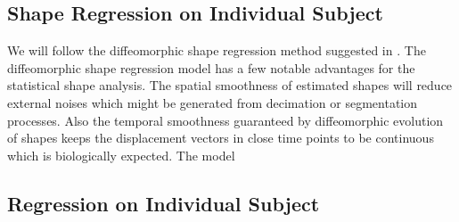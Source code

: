 \documentclass[10pt]{article}
\begin{document}
\subsection*{Shape Regression on Individual Subject}

We will follow the diffeomorphic shape regression method suggested in \cite{Fishbaugh2013}. The diffeomorphic shape regression model has a few notable advantages for the statistical shape analysis. 
The spatial smoothness of estimated shapes will reduce external noises which might be generated from decimation or segmentation processes. 
Also the temporal smoothness guaranteed by diffeomorphic evolution of shapes keeps the displacement vectors in close time points to be continuous which is biologically expected.
The model 


\subsection*{Regression on Individual Subject}





\end{document}
